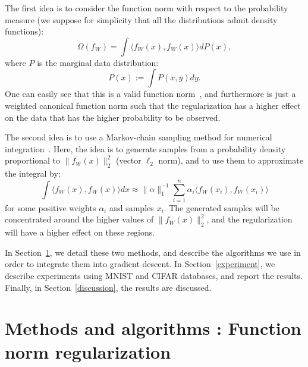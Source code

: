 \documentclass{article}
\begin{document}
The first idea is to consider the function norm with respect to the probability measure (we suppose for simplicity that all the distributions admit density functions): 
\begin{equation}
\Omega(f_W) =\int \langle f_W(x), f_W(x) \rangle dP(x),
\end{equation}
where $P$ is the marginal data distribution:
\begin{equation}
P(x):= \int P(x,y) dy.
\label{eq:proba_x}
\end{equation}
One can easily see that this is a valid function norm~\cite{galambos1995advanced}, and furthermore is just a weighted canonical function norm such that the regularization has a higher effect on the data that has the higher probability to be observed.


The second idea is to use a Markov-chain sampling method for numerical integration~\cite{andrieu2003introduction}. Here, the idea is to generate samples from a probability density proportional to $\| f_W(x)\|_2^2$ (vector $\ell_2$ norm), and to use them to approximate the integral by:
\begin{equation}
\int \langle f_W(x), f_W(x) \rangle dx \approx \|\alpha\|_1^{-1} \sum_{i=1}^n \alpha_{i} \langle f_W(x_i), f_W(x_i) \rangle
\end{equation}
for some positive weights $\alpha_i$ and samples $x_i$.
The generated samples will be concentrated around the higher values of $\| f_W(x)\|_2^2$, and the regularization will have a higher effect on these regions.


In Section~\ref{method}, we detail these two methods, and describe the algorithms we use in order to integrate them into gradient descent. In Section~\ref{experiment}, we describe experiments using MNIST and CIFAR databases, and report the results. Finally, in Section~\ref{discussion}, the results are  discussed.

\section{Methods and algorithms : Function norm regularization}
\label{method}
\end{document}
